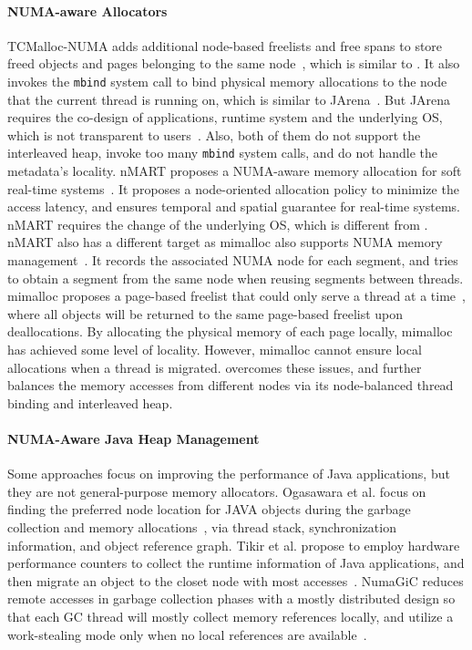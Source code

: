 \paragraph{NUMA-aware Allocators} TCMalloc-NUMA adds additional node-based freelists and free spans to store freed objects and pages belonging to the same node~\cite{tcmallocnew}, which is similar to \NM{}. It also invokes the \texttt{mbind} system call to bind physical memory allocations to the node that the current thread is running on, which is similar to JArena~\cite{yang2019jarena}. But JArena requires the co-design of applications, runtime system and the underlying OS, which is not transparent to users~\cite{yang2019jarena}. Also, both of them do not support the interleaved heap, invoke too many \texttt{mbind} system calls, and do not handle the metadata's locality. nMART proposes a NUMA-aware memory allocation for soft real-time systems~\cite{kim2013node}. It proposes a node-oriented allocation policy to minimize the access latency, and ensures temporal and spatial guarantee for real-time systems. nMART requires the change of the underlying OS, which is different from \NM{}. nMART also has a different target as 
mimalloc also supports NUMA memory management~\cite{mimalloc}. It records the associated NUMA node for each segment, and tries to obtain a segment from the same node when reusing segments between threads. mimalloc proposes a page-based freelist that could only serve a thread at a time~\cite{mimalloc}, where all objects will be returned to the same page-based freelist upon deallocations. By allocating the physical memory of each page locally, mimalloc has achieved some level of locality. However, mimalloc cannot ensure local allocations when a thread is migrated. \NM{} overcomes these issues, and further balances the memory accesses from different nodes via its node-balanced thread binding and interleaved heap. 


\paragraph{NUMA-Aware Java Heap Management} Some approaches focus on improving the performance of Java applications, but they are not general-purpose memory allocators. Ogasawara et al. focus on finding the preferred node location for JAVA objects during the garbage collection and memory allocations~\cite{Ogasawara}, via thread stack, synchronization information, and object reference graph. Tikir et al. propose to employ hardware performance counters to collect the runtime information of Java applications, and then migrate an object to the closet node with most accesses~\cite{1419934}. 
NumaGiC reduces remote accesses in garbage collection phases with a mostly distributed design so that each GC thread will mostly collect memory references locally, and utilize a work-stealing mode only when no local references are available~\cite{NumaGiC}.


